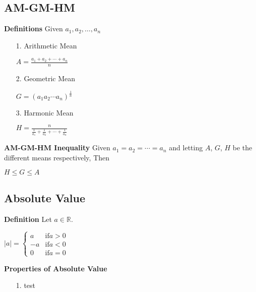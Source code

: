 \documentclass[10pt, twocolumn]{article}
\begin{document}
\subsection{AM-GM-HM}
{\bf Definitions}
\newline
Given $a_1,a_2,\dots,a_n$
\begin{enumerate}
\item[1.]{Arithmetic Mean}
\begin{center}
$A = \frac{a_1+a_2+\cdots +a_n}{n}$
\end{center}
\item[2.]{Geometric Mean}
\begin{center}
$G = (a_1a_2 \cdots a_n)^{\frac{1}{n}}$
\end{center}
\item[3.]{Harmonic Mean}
\begin{center}
$H = \frac{n}{\frac{1}{a_1}+\frac{1}{a_2}+ \cdots +\frac{1}{a_n}}$
\end{center}
\end{enumerate}
{\bf AM-GM-HM Inequality}
\newline
Given $a_1=a_2= \cdots = a_n$ and letting $A$, $G$, $H$ be the different means respectively, Then
\begin{center}
$H \leq G \leq A$
\end{center}

\subsection{Absolute Value}
{\bf Definition}
\newline
Let $a \in \mathbb{R}$.
\begin{center}
$|a| = 
\left\{ \begin{array}{ll}
a & \text{if} a>0 \\
-a & \text{if} a<0 \\
0 & \text{if} a=0
\end{array} \right.$
\end{center}

{\bf Properties of Absolute Value}
\begin{enumerate}
\item[1.]{test}


\end{enumerate}
\end{document}
